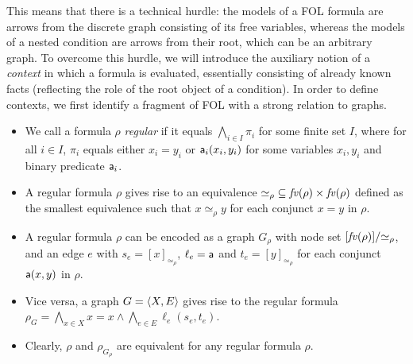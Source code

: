 \iffull
{}
This means that there is a technical hurdle: the models of a FOL formula are arrows from the discrete graph consisting of its free variables, whereas the models of a nested condition are arrows from their root, which can be an arbitrary graph. To overcome this hurdle, we will introduce the auxiliary notion of a \emph{context} in which a formula is evaluated, essentially consisting of already known facts (reflecting the role of the root object of a condition). In order to define contexts, we first identify a fragment of FOL with a strong relation to graphs.

\begin{itemize}
\item We call a formula $\rho$ \emph{regular} if it equals $\bigwedge_{i\in I} \pi_i$ for some finite set $I$, where for all $i\in I$, $\pi_i$ equals either $x_i=y_i$ or $\mathsf{a}_i(x_i,y_i)$ for some variables $x_i,y_i$ and binary predicate $\mathsf{a}_i$.

\item A regular formula $\rho$ gives rise to an equivalence ${\simeq_\rho}\subseteq \mathit{fv}(\rho)\times \mathit{fv}(\rho)$ defined as the smallest equivalence such that $x\simeq_\rho y$ for each conjunct $x=y$ in $\rho$.

\item A regular formula $\rho$ can be encoded as a graph $G_\rho$ with node set $[\mathit{fv}(\rho)]/{\simeq_\rho}$, and an edge $e$ with $s_e=[x]_{\simeq_\rho}$, $\ell_e=\mathsf{a}$ and $t_e=[y]_{\simeq_\rho}$ for each conjunct $\mathsf{a}(x,y)$ in $\rho$.

\item Vice versa, a graph $G=\langle{X,E}\rangle$ gives rise to the regular formula $\rho_G=\bigwedge_{x\in X} x=x \wedge \bigwedge_{e\in E} \ell_e(s_e,t_e)$.

\item Clearly, $\rho$ and $\rho_{G_\rho}$ are equivalent for any regular formula $\rho$.
\end{itemize}



